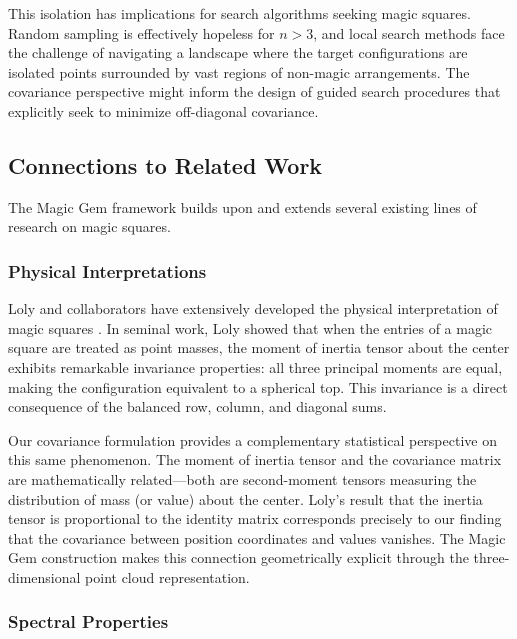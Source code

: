 This isolation has implications for search algorithms seeking magic squares.
Random sampling is effectively hopeless for $n > 3$, and local search methods face 
the challenge of navigating a landscape where the target configurations are isolated points 
surrounded by vast regions of non-magic arrangements.
The covariance perspective might inform the design of guided search procedures
that explicitly seek to minimize off-diagonal covariance.

\subsection{Connections to Related Work}

The Magic Gem framework builds upon and extends several existing lines of research on magic squares.

\subsubsection{Physical Interpretations}

Loly and collaborators have extensively developed the physical interpretation of magic squares
\cite{loly2004eigenproperties, loly2006invariance, loly2008franklin, loly2009spectra}.
In seminal work, Loly \cite{loly2006invariance} showed that when the entries of a magic square 
are treated as point masses, the moment of inertia tensor about the center exhibits remarkable 
invariance properties: all three principal moments are equal, making the configuration equivalent 
to a spherical top.
This invariance is a direct consequence of the balanced row, column, and diagonal sums.

Our covariance formulation provides a complementary statistical perspective on this same phenomenon.
The moment of inertia tensor and the covariance matrix are mathematically related---both are 
second-moment tensors measuring the distribution of mass (or value) about the center.
Loly's result that the inertia tensor is proportional to the identity matrix corresponds precisely 
to our finding that the covariance between position coordinates and values vanishes.
The Magic Gem construction makes this connection geometrically explicit through the three-dimensional 
point cloud representation.

\subsubsection{Spectral Properties}

